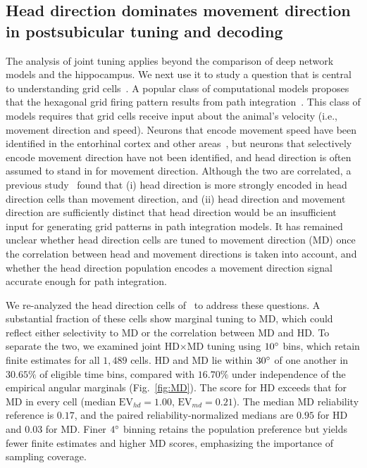 \documentclass[11pt]{article}
\begin{document}
\subsection{Head direction dominates movement direction in postsubicular tuning and decoding}

The analysis of joint tuning applies beyond the comparison of deep network models and the hippocampus. We next use it to study a question that is central to understanding grid cells~\cite{Hafting2005,Stensola2012}. A popular class of computational models proposes that the hexagonal grid firing pattern results from path integration~\cite{Burak2009,Mcnaughton2006,Couey2013,Cueva2018}. This class of models requires that grid cells receive input about the animal's velocity (i.e., movement direction and speed). Neurons that encode movement speed have been identified in the entorhinal cortex and other areas~\cite{Kropff2015speed,Hinman2016}, but neurons that selectively encode movement direction have not been identified, and head direction is often assumed to stand in for movement direction.
Although the two are correlated, a previous study~\cite{Raudies2015head} found that (i) head direction is more strongly encoded in head direction cells than movement direction, and (ii) head direction and movement direction are sufficiently distinct that head direction would be an insufficient input for generating grid patterns in path integration models. It has remained unclear whether head direction cells are tuned to movement direction (MD) once the correlation between head and movement directions is taken into account, and whether the head direction population encodes a movement direction signal accurate enough for path integration.

We re-analyzed the head direction cells of~\cite{Duszkiewicz2024} to address these questions. A substantial fraction of these cells show marginal tuning to MD, which could reflect either selectivity to MD or the correlation between MD and HD.
To separate the two, we examined joint HD$\times$MD tuning using $10\degree$ bins, which retain finite estimates for all $1{,}489$ cells. HD and MD lie within $30\degree$ of one another in $30.65\%$ of eligible time bins, compared with $16.70\%$ under independence of the empirical angular marginals (Fig.~\ref{fig:MD}). The score for HD exceeds that for MD in every cell (median $\mathrm{EV}_{hd}=1.00$, $\mathrm{EV}_{md}=0.21$). The median MD reliability reference is $0.17$, and the paired reliability-normalized medians are $0.95$ for HD and $0.03$ for MD. Finer $4\degree$ binning retains the population preference but yields fewer finite estimates and higher MD scores, emphasizing the importance of sampling coverage.
\end{document}

